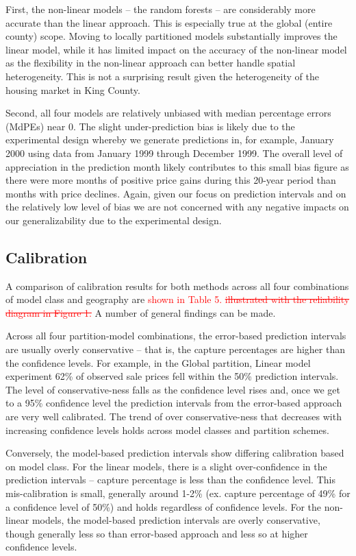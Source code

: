 \documentclass[colTwo]{anon}
\theoremstyle{definition}
\begin{document}
First, the non-linear models -- the random forests -- are considerably more accurate than the linear approach. This is especially true at the global (entire county) scope.  Moving to locally partitioned models substantially improves the linear model, while it has limited impact on the accuracy of the non-linear model as the flexibility in the non-linear approach can better handle spatial heterogeneity.  This is not a surprising result given the heterogeneity of the housing market in King County.  

Second, all four models are relatively unbiased with median percentage errors (MdPEs) near 0.  The slight under-prediction bias is likely due to the experimental design whereby we generate predictions in, for example, January 2000 using data from January 1999 through December 1999.  The overall level of appreciation in the prediction month likely contributes to this small bias figure as there were more months of positive price gains during this 20-year period than months with price declines.  Again, given our focus on prediction intervals and on the relatively low level of bias we are not concerned with any negative impacts on our generalizability due to the experimental design. 


\subsection{Calibration}

A comparison of calibration results for both methods across all four combinations of model class and geography are \textcolor{red}{shown in Table 5. \st{illustrated with the reliability diagram in Figure 1.}}  A number of general findings can be made.  

Across all four partition-model combinations, the error-based prediction intervals are usually overly conservative -- that is, the capture percentages are higher than the confidence levels.  For example, in the Global partition, Linear model experiment 62\% of observed sale prices fell within the 50\% prediction intervals.  The level of conservative-ness falls as the confidence level rises and, once we get to a 95\% confidence level the prediction intervals from the error-based approach are very well calibrated.  The trend of over conservative-ness that decreases with increasing confidence levels holds across model classes and partition schemes.  

Conversely, the model-based prediction intervals show differing calibration based on model class.  For the linear models, there is a slight over-confidence in the prediction intervals -- capture percentage is less than the confidence level.  This mis-calibration is small, generally around 1-2\% (ex. capture percentage of 49\% for a confidence level of 50\%) and holds regardless of confidence levels. For the non-linear models, the model-based prediction intervals are overly conservative, though generally less so than error-based approach and less so at higher confidence levels. 
\end{document}
